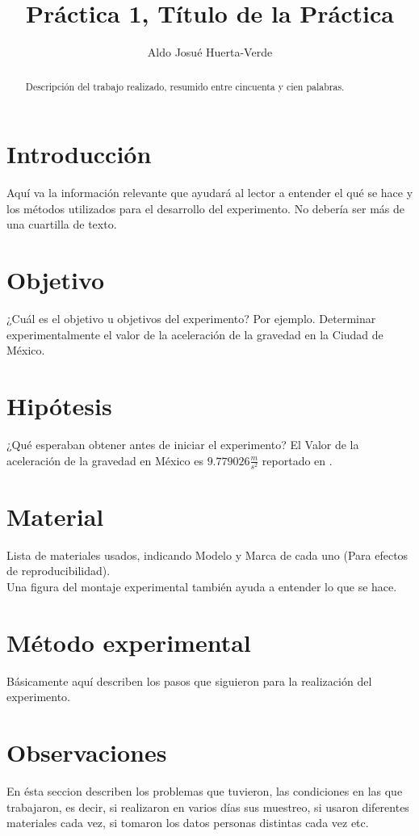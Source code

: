 \documentclass[10pt,letterpaper]{article}
\author{Aldo Josué Huerta-Verde}
\title{Práctica 1, Título de la Práctica }
\begin{document}
\maketitle

\begin{abstract}
Descripción del trabajo realizado, resumido entre cincuenta y cien palabras.
\end{abstract}

\section{Introducción}
Aquí va la información relevante que ayudará al lector a entender el qué se hace y los métodos utilizados para el desarrollo del experimento. No debería ser más de una cuartilla de texto. \cite{intro_datos}%

\section{Objetivo}
¿Cuál es el objetivo u objetivos del experimento?
Por ejemplo.
Determinar experimentalmente el valor de la aceleración de la gravedad en la Ciudad de México.

\section{Hipótesis}
¿Qué esperaban obtener antes de iniciar el experimento?
El Valor de la aceleración de la gravedad en México es $9.779026\frac{m}{s^2}$ reportado en \cite{cenam_gravedad}.

\section{Material}
Lista de materiales usados, indicando Modelo y Marca de cada uno (Para efectos de reproducibilidad). \\
Una figura del montaje experimental también ayuda a entender lo que se hace.

\section{Método experimental}
Básicamente aquí describen los pasos que siguieron para la realización del experimento.

\section{Observaciones}
En ésta seccion describen los problemas que tuvieron, las condiciones en las que trabajaron, es decir, si realizaron en varios días sus muestreo, si usaron diferentes materiales cada vez, si tomaron los datos personas distintas cada vez etc.
\end{document}
